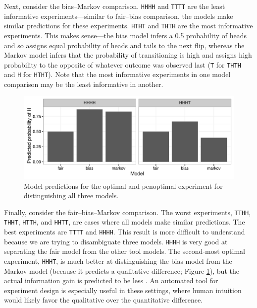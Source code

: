 \documentclass{article}
\begin{document}
Next, consider the bias--Markov comparison.
\lstinline{HHHH} and \lstinline{TTTT} are the least informative experiments---similar to fair--bias comparison, the models make similar predictions for these experiments.
\lstinline{HTHT} and \lstinline{THTH} are the most informative experiments.
This makes sense---the bias model infers a 0.5 probability of heads and so assigns equal probability of heads and tails to the next flip, whereas the Markov model infers that the probability of transitioning is high and assigns high probability to the opposite of whatever outcome was observed last (\lstinline{T} for \lstinline{THTH} and \lstinline{H} for \lstinline{HTHT}).
Note that the most informative experiments in one model comparison may be the least informative in another.


\begin{figure}[t]
\centering
\includegraphics[width=0.7\columnwidth]{img/coin_predictions.pdf}
\caption{Model predictions for the optimal and penoptimal experiment for distinguishing all three models.}
\label{fig:coin_preds}
\end{figure}


Finally, consider the fair--bias--Markov comparison.
The worst experiments, \lstinline{TTHH}, \lstinline{THHT}, \lstinline{HTTH}, and \lstinline{HHTT}, are cases where all models make similar predictions.
The best experiments are \lstinline{TTTT} and \lstinline{HHHH}.
This result is more difficult to understand because we are trying to disambiguate three models.
\lstinline{HHHH} is very good at separating the fair model from the other tool models. 
The second-most optimal experiment, \lstinline{HHHT}, is much better at distinguishing the bias model from the Markov model (because it predicts a qualitative difference; Figure \ref{fig:coin_preds}), but the actual information gain is predicted to be less .
An automated tool for experiment design is especially useful in these settings, where human intuition would likely favor the qualitative over the quantitative difference.
\end{document}
